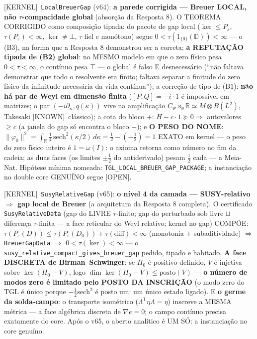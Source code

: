 \documentclass[11pt]{article}
\providecommand{\kernelmk}[1]{\textsf{[KERNEL]}~\texttt{#1}}\providecommand{\knownmk}[1]{\textsf{[KNOWN]}~{#1}}\providecommand{\statusmk}[1]{\textsf{[#1]}}
\theoremstyle{definition}\newtheorem{deriv}{Derivação}
\begin{document}
\kernelmk{LocalBreuerGap} (v64): \textbf{a parede corrigida --- Breuer LOCAL, não $\tau$-compacidade global} (absorção da Resposta 8). O TEOREMA CORRIGIDO como composição tipada: do pacote de gap local ($\ker\le P_\varepsilon$, $\tau(P_\varepsilon)<\infty$, $\ker\neq\bot$, $\tau$ fiel e monótono) segue $0<\tau(1_{\{0\}}(\mathbb D))<\infty$ --- o (B3), na forma que a Resposta 8 demonstrou ser a correta; \textbf{a REFUTAÇÃO tipada de (B2) global}: no MESMO modelo em que o zero físico pesa $0<\tau<\infty$, o contínuo pesa $\top$ --- o global é falso E desnecessário (``não faltava demonstrar que todo o resolvente era finito; faltava separar a finitude do zero físico da infinitude necessária da vida contínua''); a correção de tipo de (B1): \textbf{não há par de Weyl em dimensão finita} ($[P,Q]=-i\cdot1$ é impossível em matrizes; o par $(-i\partial_\kappa,q(\kappa))$ vive na amplificação $C_\Psi\rtimes_\theta\mathbb R\simeq M\overline\otimes B(L^2)$, Takesaki \knownmk{clássico}); a cota do bloco $+$: $H-c\cdot1\succeq0\Rightarrow$ autovalores $\ge c$ (a janela do gap só encontra o bloco $-$); e \textbf{O PESO DO NOME}: $\|\varphi_0\|^2=\int_{\mathbb R}\tfrac14\,\mathrm{sech}^2(\kappa/2)\,d\kappa=\tfrac12-(-\tfrac12)=1$ EXATO em kernel --- o peso do zero físico inteiro é $1=\omega(I)$: o axioma retorna como número no fim da cadeia; as duas faces (os limites $\pm\tfrac12$ do antiderivado) pesam $\tfrac12$ cada --- a Meia-Nat. Hipótese mínima nomeada: \texttt{TGL\_LOCAL\_BREUER\_GAP\_PACKAGE}; a instanciação no double core GENUÍNO segue \statusmk{OPEN}.

\kernelmk{SusyRelativeGap} (v65): \textbf{o nível 4 da camada --- SUSY-relativo $\Rightarrow$ gap local de Breuer} (a arquitetura da Resposta 8 completa). O certificado \texttt{SusyRelativeData} (gap do LIVRE $\tau$-finito; gap do perturbado sob livre $\sqcup$ diferença $\tau$-finita --- a face reticular do Weyl relativo; kernel no gap) COMPÕE: $\tau(P_\varepsilon(D))\le\tau(P_\varepsilon(D_0))+\tau(\mathrm{diff})<\infty$ (monotonia $+$ subaditividade) $\Rightarrow$ \texttt{BreuerGapData} $\Rightarrow$ $0<\tau(\ker)<\infty$ --- o \texttt{susy\_relative\_compact\_gives\_breuer\_gap} pedido, tipado e habitado. \textbf{A face DISCRETA de Birman--Schwinger}: se $H_0$ é positivo-definido, $V$ é injetiva sobre $\ker(H_0-V)$, logo $\dim\ker(H_0-V)\le\mathrm{posto}(V)$ --- \textbf{o número de modos zero é limitado pelo POSTO DA INSCRIÇÃO} (o modo zero do TGL é único porque $-\tfrac12\mathrm{sech}^2$ é posto um: um único estado ligado). E \textbf{o germe da solda-campo}: o transporte isométrico ($\Lambda^\mathsf{T}\eta\Lambda=\eta$) inscreve a MESMA métrica --- a face algébrica discreta de $\nabla e=0$; o campo contínuo precisa exatamente do core. Após o v65, o aberto analítico é UM SÓ: a instanciação no core genuíno.
\end{document}
